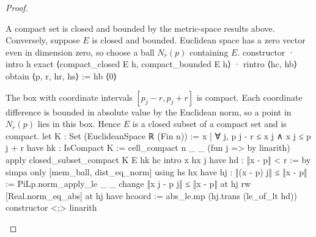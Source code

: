 \begin{proof}
  \begin{lean}{A compact set is closed and bounded by the metric-space results above. Conversely, suppose $E$ is closed and bounded. Euclidean space has a zero vector even in dimension zero, so choose a ball $N_r(p)$ containing $E$.}
    constructor
    · intro h
      exact ⟨compact_closed E h, compact_bounded E h⟩
    · rintro ⟨hc, hb⟩
      obtain ⟨p, r, hr, hs⟩ := hb ⟨0⟩
  \end{lean}

  \begin{lean}{The box with coordinate intervals $[p_j-r,p_j+r]$ is compact. Each coordinate difference is bounded in absolute value by the Euclidean norm, so a point in $N_r(p)$ lies in this box. Hence $E$ is a closed subset of a compact set and is compact.}
    let K : Set (EuclideanSpace ℝ (Fin n)) := {x | ∀ j, p j - r ≤ x j ∧ x j ≤ p j + r}
    have hk : IsCompact K := cell_compact n _ _ (fun j => by linarith)
    apply closed_subset_compact K E hk hc
    intro x hx j
    have hd : ‖x - p‖ < r := by simpa only [mem_ball, dist_eq_norm] using hs hx
    have hj : ‖(x - p) j‖ ≤ ‖x - p‖ := PiLp.norm_apply_le _ _
    change ‖x j - p j‖ ≤ ‖x - p‖ at hj
    rw [Real.norm_eq_abs] at hj
    have hcoord := abs_le.mp (hj.trans (le_of_lt hd))
    constructor <;> linarith
  \end{lean}

\end{proof}
